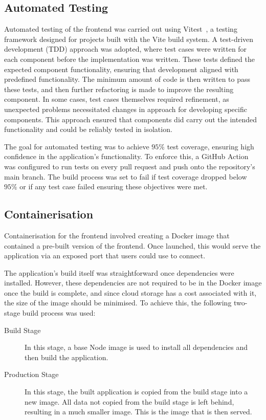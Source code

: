 \subsection{Automated Testing}
Automated testing of the frontend was carried out using Vitest~\cite{Vitest}, a testing framework designed for projects built with the Vite build system. A test-driven development (TDD) approach was adopted, where test cases were written for each component before the implementation was written. These tests defined the expected component functionality, ensuring that development aligned with predefined functionality. The minimum amount of code is then written to pass these tests, and then further refactoring is made to improve the resulting component. In some cases, test cases themselves required refinement, as unexpected problems necessitated changes in approach for developing specific components. This approach ensured that components did carry out the intended functionality and could be reliably tested in isolation.

The goal for automated testing was to achieve $95\%$ test coverage, ensuring high confidence in the application's functionality. To enforce this, a GitHub Action was configured to run tests on every pull request and push onto the repository's main branch. The build process was set to fail if test coverage dropped below $95\%$ or if any test case failed ensuring these objectives were met.

\subsection{Containerisation}
Containerisation for the frontend involved creating a Docker image that contained a pre-built version of the frontend. Once launched, this would serve the application via an exposed port that users could use to connect.

The application's build itself was straightforward once dependencies were installed. However, these dependencies are not required to be in the Docker image once the build is complete, and since cloud storage has a cost associated with it, the size of the image should be minimised. To achieve this, the following two-stage build process was used:

\begin{description}
    \item[Build Stage] In this stage, a base Node image is used to install all dependencies and then build the application.
    \item[Production Stage] In this stage, the built application is copied from the build stage into a new image. All data not copied from the build stage is left behind, resulting in a much smaller image. This is the image that is then served.
\end{description}

